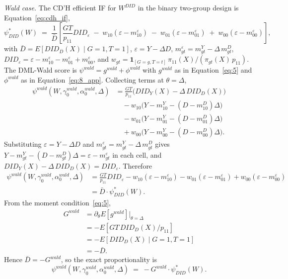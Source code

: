\begin{propproof}
\medskip
\noindent\textit{Wald case.} The CD'H efficient IF for $W^{DID}$ in the binary two-group design is Equation~\eqref{eq:cdh_if},
\begin{equation*}
    \psi^{*}_{DID}(W) \;=\; \frac{1}{\bar{D}}\!\left[\frac{GT}{p_{11}}DID_\varepsilon \;-\; w_{10}(\varepsilon-m^\varepsilon_{10}) \;-\; w_{01}(\varepsilon-m^\varepsilon_{01}) \;+\; w_{00}(\varepsilon-m^\varepsilon_{00})\right],
\end{equation*}
with $\bar{D} = E[DID_D(X)\mid G\!=\!1,T\!=\!1]$, $\varepsilon = Y - \Delta D$, $m^\varepsilon_{gt} = m^Y_{gt} - \Delta\, m^D_{gt}$, $DID_\varepsilon = \varepsilon - m^\varepsilon_{10} - m^\varepsilon_{01} + m^\varepsilon_{00}$, and $w_{gt} = \mathbf{1}_{[G=g,T=t]}\,\pi_{11}(X)/(\pi_{gt}(X)\,p_{11})$. The DML-Wald score is $\psi^{wald} = g^{wald} + \phi^{wald}$ with $g^{wald}$ as in Equation~\eqref{eq:5} and $\phi^{wald}$ as in Equation~\eqref{eq:8_app}. Collecting terms at $\theta = \Delta$,
\begin{align*}
    \psi^{wald}(W,\gamma^{wald}_0,\alpha^{wald}_0,\Delta)
    &= \frac{GT}{p_{11}}\bigl(DID_Y(X) - \Delta\,DID_D(X)\bigr) \\
    &\quad - w_{10}\bigl(Y - m^Y_{10} - (D - m^D_{10})\Delta\bigr) \\
    &\quad - w_{01}\bigl(Y - m^Y_{01} - (D - m^D_{01})\Delta\bigr) \\
    &\quad + w_{00}\bigl(Y - m^Y_{00} - (D - m^D_{00})\Delta\bigr).
\end{align*}
Substituting $\varepsilon = Y - \Delta D$ and $m^\varepsilon_{gt} = m^Y_{gt} - \Delta\, m^D_{gt}$ gives $Y - m^Y_{gt} - (D - m^D_{gt})\Delta = \varepsilon - m^\varepsilon_{gt}$ in each cell, and $DID_Y(X) - \Delta\,DID_D(X) = DID_\varepsilon$. Therefore
\begin{align*}
    \psi^{wald}(W,\gamma^{wald}_0,\alpha^{wald}_0,\Delta)
    &= \frac{GT}{p_{11}}DID_\varepsilon
    - w_{10}(\varepsilon-m^\varepsilon_{10})
    - w_{01}(\varepsilon-m^\varepsilon_{01})
    + w_{00}(\varepsilon-m^\varepsilon_{00}) \\
    &= \bar{D}\cdot\psi^{*}_{DID}(W).
\end{align*}
From the moment condition~\eqref{eq:5},
\begin{align*}
    G^{wald}
    &= \partial_\theta E[g^{wald}]\big|_{\theta=\Delta} \\
    &= -E[GT\,DID_D(X)/p_{11}] \\
    &= -E[DID_D(X)\mid G\!=\!1,T\!=\!1] \\
    &= -\bar{D}.
\end{align*}
Hence $\bar{D}=-G^{wald}$, so the exact proportionality is
\begin{equation*}
    \psi^{wald}(W,\gamma^{wald}_0,\alpha^{wald}_0,\Delta) \;=\; -G^{wald}\cdot\psi^{*}_{DID}(W).
\end{equation*}


\end{propproof}

